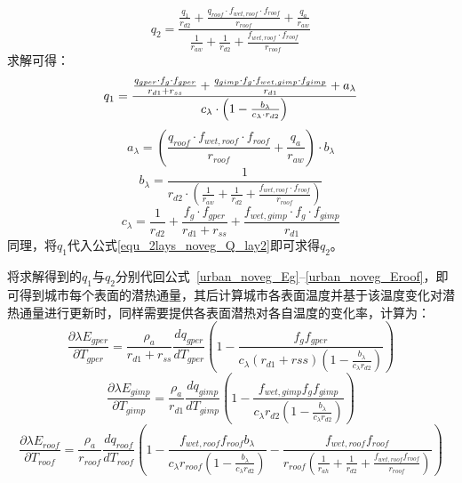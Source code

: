 %
\begin{equation}\label{equ_2lays_noveg_Q_lay2}
    q_{2} = \frac{\frac{q_{1}}{r_{d2}} + \frac{q_{roof} \cdot f_{wet,roof} \cdot f_{roof}}{r_{roof}} + \frac{q_a}{r_{aw}}}{\frac{1}{r_{aw}} + \frac{1}{r_{d2}} + \frac{f_{wet,roof} \cdot f_{roof}}{r_{roof}}}
\end{equation}
求解可得：
\begin{equation}
    q_{1} = \\
    \frac{\frac{q_{gper} \cdot f_{g} \cdot f_{gper}}{r_{d1}+r_{ss}} + \frac{q_{gimp} \cdot f_{g} \cdot f_{wet,gimp} \cdot f_{gimp}}{r_{d1} } + a_{\lambda}}{c_{\lambda} \cdot \left( 1 - \frac{b_{\lambda}}{c_{\lambda} \cdot r_{d2}}\right)}
\end{equation}
%
\begin{equation}
    a_{\lambda}= \left(\frac{q_{roof} \cdot f_{wet,roof} \cdot f_{roof}}{r_{roof}} + \frac{q_a}{r_{aw}}\right) \cdot b_{\lambda}
\end{equation}
%
\begin{equation}
    b_{\lambda} = \frac{1}{r_{d2} \cdot \left( \frac{1}{r_{aw}} + \frac{1}{r_{d2}} + \frac{f_{wet,roof} \cdot f_{roof}}{r_{roof}} \right)}
\end{equation}
%
\begin{equation}
    c_{\lambda} = \frac{1}{r_{d2}}+\frac{f_g \cdot f_{gper}}{r_{d1}+r_{ss}} + \frac{f_{wet,gimp} \cdot f_g \cdot f_{gimp}}{r_{d1}}
\end{equation}
同理，将$q_{1}$代入公式\eqref{equ_2lays_noveg_Q_lay2}即可求得$q_{2}$。

将求解得到的$q_{1}$与$q_{2}$分别代回公式~\ref{urban_noveg_Eg}--\ref{urban_noveg_Eroof}，即可得到城市每个表面的潜热通量，其后计算城市各表面温度并基于该温度变化对潜热通量进行更新时，同样需要提供各表面潜热对各自温度的变化率，计算为：
\begin{equation}
\frac{\partial \lambda E_{gper}}{\partial T_{gper}} = \frac{\rho _a}{r_{d1}+r_{ss}} \frac{dq_{gper}}{dT_{gper}} \left(1-\frac{f_{g}f_{gper}}{c_{\lambda} \left(r_{d1}+rss\right) \left(1-\frac{b_{\lambda}}{c_{\lambda} r_{d2}}\right)}\right)
\end{equation}
%
\begin{equation}
\frac{\partial \lambda E_{gimp}}{\partial T_{gimp}} = \frac{\rho _a}{r_{d1}} \frac{dq_{gimp}}{dT_{gimp}} \left(1-\frac{f_{wet,gimp} f_{g} f_{gimp}}{c_{\lambda} r_{d2}\left(1-\frac{b_{\lambda}}{c_{\lambda} r_{d2}}\right)}\right)
\end{equation}
%
\begin{equation}
\frac{\partial \lambda E_{roof}}{\partial T_{roof}} = \frac{\rho _a}{r_{roof}} \frac{dq_{roof}}{dT_{roof}} \left(1-\frac{f_{wet,roof}f_{roof} b_{\lambda}}{c_{\lambda} r_{roof} \left(1-\frac{b_{\lambda}}{c_{\lambda} r_{d2}}\right)}-\frac{f_{wet,roof}f_{roof}}{r_{roof}\left(\frac{1}{r_{ah}}+\frac{1}{r_{d2}}+\frac{f_{wet,roof} f_{roof}}{r_{roof}}\right)}\right)
\end{equation}

